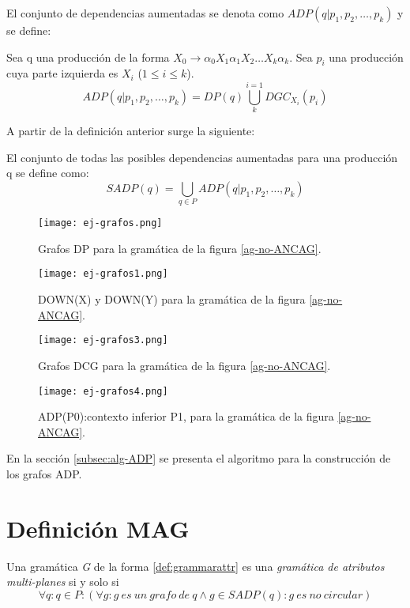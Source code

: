 El conjunto de dependencias aumentadas se denota como $ADP (q | p_{1}, p_{2}, \dots, p_{k})$ y se define:
\begin{definition}
Sea q una producción de la forma $X_{0}\rightarrow \alpha_{0} X_{1} \alpha_{1} X_{2} \dots X_{k} \alpha_{k}$. Sea $p_{i}$ una producción cuya parte izquierda es $X_{i}$ ($1\leqslant i \leqslant k$). 
\begin{equation}
ADP (q | p_{1}, p_{2}, \dots, p_{k}) = DP(q) \bigcup\limits_{k}^{i=1}{DGC_{X_{i}}} (p_{i})
\end{equation}
\end{definition}

A partir de la definición anterior surge la siguiente:
\begin{definition}
El conjunto de todas las posibles dependencias aumentadas para una producción q se define como:
\begin{equation}
SADP(q) = \bigcup\limits_{q\in P}{ADP (q | p_{1}, p_{2}, \dots, p_{k})} 
\end{equation}
\end{definition}

\begin{figure}\centering
 \texttt{[image: ej-grafos.png]}
\caption{\label{dp-wuu-yang}Grafos DP para la gramática de la figura \ref{ag-no-ANCAG}.}
\end{figure}
\begin{figure}\centering
 \texttt{[image: ej-grafos1.png]}
\caption{\label{down-wuu-yang} DOWN(X) y DOWN(Y) para la gramática de la figura \ref{ag-no-ANCAG}.}
\end{figure}

\begin{figure}\centering
 \texttt{[image: ej-grafos3.png]}
\caption{\label{dcg-wuu-yang} Grafos DCG para la gramática de la figura \ref{ag-no-ANCAG}.}
\end{figure}

\begin{figure}\centering
 \texttt{[image: ej-grafos4.png]}
\caption{\label{adp-wuu-yang} ADP(P0):contexto inferior P1, para la gramática de la figura \ref{ag-no-ANCAG}.}
\end{figure}

En la sección \ref{subsec:alg-ADP} se presenta el algoritmo para la construcción de los grafos ADP.

\section{Definición MAG}
\label{def:MAG}
Una gramática \textit{G} de la forma \ref{def:grammarattr} es una \textit{gramática de atributos multi-planes} si y solo si 
\begin{equation}
\forall q : q \in P: (\forall g:g\ es\ un\ grafo\ de\ q \wedge g \in SADP(q) : g\ es\ no\ circular) 
\end{equation}


